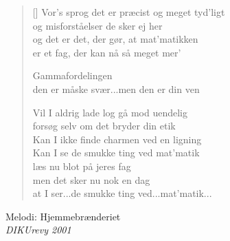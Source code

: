 \begin{multicols}{2}
\begin{verse}[\versewidth]
Vor’s sprog det er præcist og meget tyd’ligt\\
og misforståelser de sker ej her\\
og det er det, der gør, at mat’matikken\\
er et fag, der kan nå så meget mer’

Gammafordelingen\\
den er måske svær...men den er din ven

Vil I aldrig lade log gå mod uendelig\\
forsøg selv om det bryder din etik\\
Kan I ikke finde charmen ved en ligning\\
Kan I se de smukke ting ved mat’matik\\
læs nu blot på jeres fag\\
men det sker nu nok en dag\\
at I ser...de smukke ting ved...mat’matik...
\end{verse}
\end{multicols}

{Melodi: Hjemmebrænderiet}\\[.2em]
{\small\itshape DIKUrevy 2001}

